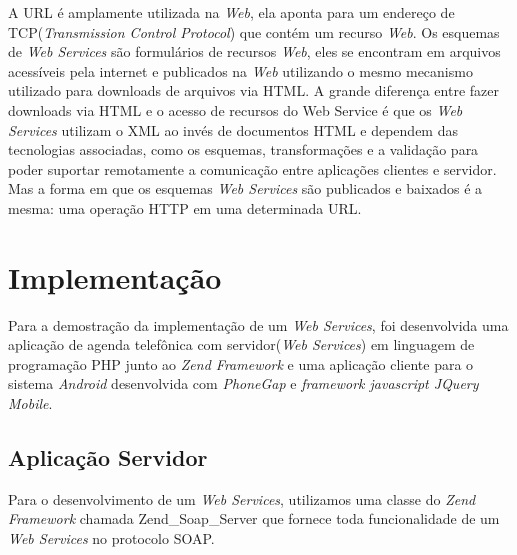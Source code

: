 \documentclass{acm_proc_article-sp}
\begin{document}
			A URL é amplamente utilizada na \emph{Web}, ela aponta para um endereço de TCP(\emph{Transmission Control Protocol}) que contém um recurso \emph{Web}. Os esquemas de \emph{Web Services} são formulários de recursos \emph{Web}, eles se encontram em arquivos acessíveis pela internet e publicados na \emph{Web} utilizando o mesmo mecanismo utilizado para downloads de arquivos via HTML. A grande diferença entre fazer downloads via HTML e o acesso de recursos do Web Service é que os \emph{Web Services} utilizam o XML ao invés de documentos HTML e dependem das tecnologias associadas, como os esquemas, transformações e a validação para poder suportar remotamente a comunicação entre aplicações clientes e servidor. Mas a forma em que os esquemas \emph{Web Services} são publicados e baixados é a mesma: uma operação HTTP em uma determinada URL.
			
		
\section{Implementação}


	Para a demostração da implementação de um \emph{Web Services}, foi desenvolvida uma aplicação de agenda telefônica com servidor(\emph{Web Services}) em linguagem de programação PHP junto ao \emph{Zend Framework} e uma aplicação cliente para o sistema \emph{Android} desenvolvida com \emph{PhoneGap} e \emph{framework javascript JQuery Mobile}.
	
	\subsection{Aplicação Servidor}

	Para o desenvolvimento de um \emph{Web Services}, utilizamos uma classe do \emph{Zend Framework} chamada Zend\_Soap\_Server que fornece toda funcionalidade de um \emph{Web Services} no protocolo SOAP. 
	
\end{document}
